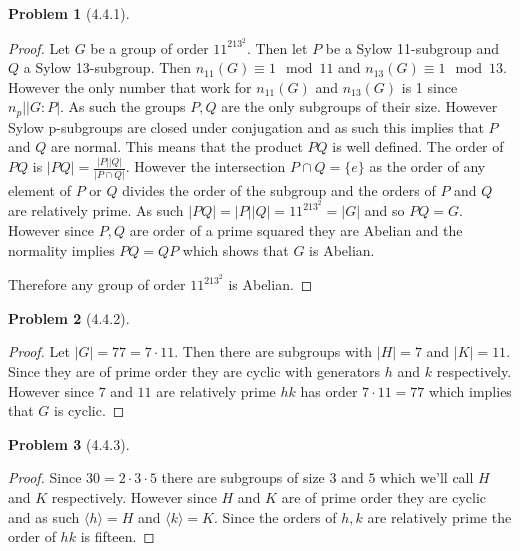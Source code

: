 \documentclass[10pt]{article}
\newcommand{\sk}{\vskip 10mm}
\theoremstyle{plain}
\newtheorem{problem}{Problem}
\theoremstyle{remark}
\begin{document}
\sk

\begin{problem}[4.4.1]
  
\end{problem}

\begin{proof}
  Let $G$ be a group of order $11^213^2$. Then let $P$ be a Sylow 11-subgroup
  and $Q$ a Sylow 13-subgroup. Then $n_{11}(G)\equiv 1\mod 11$ and $n_{13}(G)\equiv 1\mod 13$.
  However the only number that work for $n_{11}(G)$ and $n_{13}(G)$ is 1 since
  $n_p\bigr| |G:P|$. As such
  the groups $P,Q$ are the only subgroups of their size. However Sylow p-subgroups
  are closed under conjugation and as such this implies that $P$ and $Q$ are normal.
  This means that the product $PQ$ is well defined. The order of $PQ$ is
  $|PQ|=\frac{|P||Q|}{|P\cap Q|}$. However the intersection $P\cap Q=\{e\}$ as the order
  of any element of $P$ or $Q$ divides the order of the subgroup and the orders of
  $P$ and $Q$ are relatively prime. As such $|PQ|=|P||Q|=11^213^2=|G|$ and so
  $PQ=G$. However since $P,Q$ are order of a prime squared they are Abelian
  and the normality implies $PQ=QP$ which shows that $G$ is Abelian.

  Therefore any group of order $11^213^2$ is Abelian.
\end{proof}

\sk

\begin{problem}[4.4.2]
  
\end{problem}

\begin{proof}
  Let $|G|=77=7\cdot 11$. Then there are subgroups with $|H|=7$  and
  $|K|=11$. Since they are of prime order they are cyclic with
  generators $h$ and $k$ respectively. However since $7$ and $11$
  are relatively prime $hk$ has order $7\cdot 11=77$ which implies that
  $G$ is cyclic.
\end{proof}

\sk

\begin{problem}[4.4.3]
  
\end{problem}

\begin{proof}
  Since $30=2\cdot 3\cdot 5$ there are subgroups of size $3$ and $5$ which we'll
  call $H$ and $K$ respectively. However since $H$ and $K$ are of
  prime order they are cyclic and as such $\langle h\rangle=H$ and $\langle k\rangle= K$. Since
  the orders of $h,k$ are relatively prime the order of $hk$ is fifteen.
\end{proof}

\sk

\end{document}
